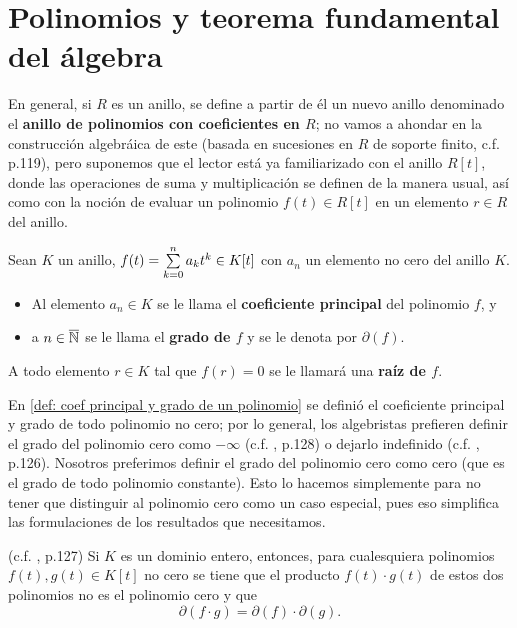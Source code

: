 \section{Polinomios y teorema fundamental del álgebra}

En general, si $R$ es un anillo, se define a partir de 
él un nuevo anillo denominado el \textbf{anillo de polinomios
con coeficientes en $R$}; 
no vamos a ahondar en la construcción
algebráica de este (basada en sucesiones en $R$ de soporte
finito, c.f. \cite{jacobson} p.119), pero suponemos
que el lector está ya familiarizado con el anillo
$R[t]$, donde las operaciones de suma y multiplicación
se definen de la manera usual, así como con la noción
de evaluar un polinomio $f(t) \in R[t]$ en un elemento
$r \in R$ del anillo.


\begin{defi}
\label{def: coef principal y grado de un polinomio}
Sean $K$ un anillo, $f(t)= \sum\limits_{k=0}^{n}a_{k}t^{k} \in K[t]$
con $a_{n}$ un elemento no cero del anillo $K$.
\begin{itemize}
\item Al elemento $a_{n} \in K$ se le llama el \textbf{coeficiente
principal} del polinomio $f$, y
\item a $n \in \overline{\mathbb{N}}$ se le llama el \textbf{grado de $f$}
y se le denota por $\partial(f)$.
\end{itemize}
A todo elemento $r \in K$ tal que $f(r)=0$ se le llamará 
una \textbf{raíz de $f$}. 
\end{defi}


\begin{nota}
En \ref{def: coef principal y grado de un polinomio} se definió
el coeficiente principal y grado de todo polinomio no cero; 
por lo general, los algebristas prefieren definir el grado del 
polinomio cero como $-\infty$
(c.f. \cite{jacobson}, p.128) 
o dejarlo indefinido (c.f. \cite{rotman}, p.126).
Nosotros preferimos definir el grado del polinomio cero como
cero (que es el grado de todo polinomio constante). Esto lo hacemos
simplemente para no tener que distinguir al polinomio
cero como un caso especial, pues eso simplifica las formulaciones
de los resultados que necesitamos.
\end{nota}


\begin{prop}
\label{prop: grado producto polin}
(c.f. \cite{rotman}, p.127)
Si $K$ es un dominio entero, entonces, para cualesquiera
polinomios $f(t), g(t) \in K[t]$ no cero se tiene que
el producto $f(t) \cdot g(t)$ de estos dos polinomios no
es el polinomio cero y que
\[
\partial(f \cdot g) = \partial(f) \cdot \partial(g).
\]
\end{prop}

